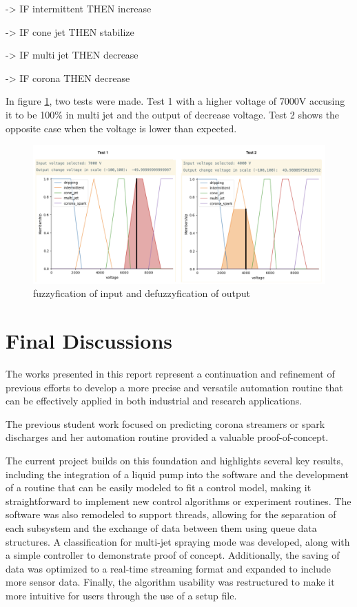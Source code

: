         -> IF intermittent THEN increase

        -> IF cone jet THEN stabilize

        -> IF multi jet THEN decrease

        -> IF corona THEN decrease


        In figure \ref{fig:fuzzyy1}, two tests were made. Test 1 with a higher voltage of 7000V accusing it to be 100\% in multi jet and the output of decrease voltage. Test 2 shows the opposite case when the voltage is lower than expected.

    \begin{figure}[H]
        \centering
        \includegraphics[width=17cm]{Figuras/fuzzy/test3.png}
        \caption{fuzzyfication of input and defuzzyfication of output}
        \label{fig:fuzzyy1}
    \end{figure}
        

    \section{Final Discussions}

        The works presented in this report represent a continuation and refinement of previous efforts to develop a more precise and versatile automation routine that can be effectively applied in both industrial and research applications. 
        
        The previous student work focused on predicting corona streamers or spark discharges\cite{Monica} and her automation routine provided a valuable proof-of-concept. 
        
        The current project builds on this foundation and highlights several key results, including the integration of a liquid pump into the software and the development of a routine that can be easily modeled to fit a control model, making it straightforward to implement new control algorithms or experiment routines. 
        The software was also remodeled to support threads, allowing for the separation of each subsystem and the exchange of data between them using queue data structures. A classification for multi-jet spraying mode was developed, along with a simple controller to demonstrate proof of concept. 
        Additionally, the saving of data was optimized to a real-time streaming format and expanded to include more sensor data. Finally, the algorithm usability was restructured to make it more intuitive for users through the use of a setup file.

        
\clearpage
